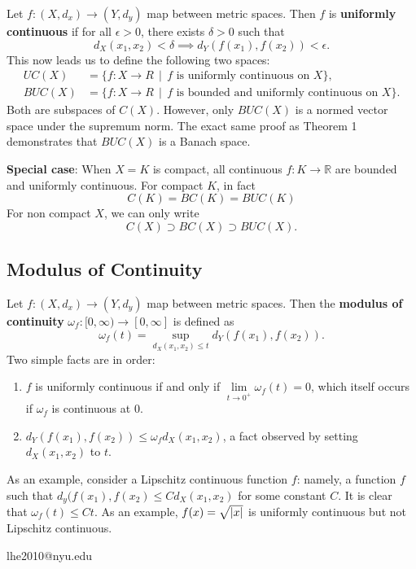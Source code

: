 \documentclass[11pt]{article}
\begin{document}
Let $f : (X, d_{x}) \to (Y, d_{y})$ map between metric spaces. Then $f$ is \textbf{uniformly continuous} if for all $\epsilon > 0$, there exists $\delta > 0$ such that
\[
	d_{X}(x_{1}, x_{2}) < \delta \implies d_{Y}(f(x_{1}), f(x_{2})) < \epsilon.
\]
This now leads us to define the following two spaces:
\begin{align*}
	UC(X) &= \{ f : X \to R \, \mid \, f \text{ is uniformly continuous on } X \}, \\
	BUC(X) &= \{ f : X \to R \, \mid \, f \text{ is bounded and uniformly continuous on } X \}.
\end{align*}
Both are subspaces of $C(X)$. However, only $BUC(X)$ is a normed vector space under the supremum norm. The exact same proof as Theorem 1 demonstrates that $BUC(X)$ is a Banach space.

\textbf{Special case}: When $X = K$ is compact, all continuous $f : K \to \mathbb{R}$ are bounded and uniformly continuous. For compact $K$, in fact
\[
	C(K) = BC(K) = BUC(K)
\]
For non compact $X$, we can only write 
\[
	C(X) \supset BC(X) \supset BUC(X).
\]


\subsection{Modulus of Continuity}

Let $f : (X, d_{x}) \to (Y, d_{y})$ map between metric spaces. Then the \textbf{modulus of continuity} $\omega_{f} : [0, \infty) \to [0, \infty]$ is defined as
\[
	\omega_{f}(t) = \sup\limits_{d_{X}(x_{1}, x_{2}) \le t} d_{Y}(f(x_{1}), f(x_{2})).
\]
Two simple facts are in order:
\begin{enumerate}
	\item $f$ is uniformly continuous if and only if $\lim\limits_{t \to 0^{+}} \omega_{f}(t) = 0$, which itself occurs if $\omega_{f}$ is continuous at $0$.
	\item $d_{Y}(f(x_{1}), f(x_{2})) \le \omega_{f} d_{X}(x_{1}, x_{2})$, a fact observed by setting $d_{X}(x_{1}, x_{2})$ to $t$.
\end{enumerate}
As an example, consider a Lipschitz continuous function $f$: namely, a function $f$ such that $d_{y}(f(x_{1}), f(x_{2}) \le C d_{X}(x_{1}, x_{2})$ for some constant $C$. It is clear that $\omega_{f}(t) \le Ct$. As an example, $f(x) = \sqrt{\abs{x}}$ is uniformly continuous but not Lipschitz continuous.

lhe2010@nyu.edu
\end{document}
